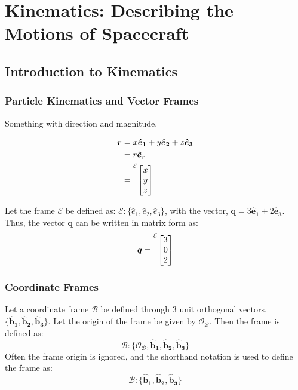 \section{Kinematics: Describing the Motions of Spacecraft}
\subsection{Introduction to Kinematics}

\subsubsection{Particle Kinematics and Vector Frames}
\label{sub_sec:Particle Kinematics and Vector Frames}
Something with direction and magnitude.

\[
	\begin{aligned}
		\bm{r} & = x \bm{{\hat{e}_{1}}} + y \bm{{\hat{e}_{2}}} + z \bm{{\hat{e}_{3}}} \\
		       & = r \bm{{\hat{e}_{r}}}                                               \\
		       & = \prescript{\mathcal{E}}{}{
			\begin{bmatrix}
				x \\
				y \\
				z
			\end{bmatrix}
		}                                                                             \\
	\end{aligned}
\]

\begin{example}
	Let the frame \(\mathcal{E} \) be defined as: \(\mathcal{E} \colon \{ \hat{e} _1, \hat{e} _2, \hat{e} _3\} \), with the vector, \(\bm{q}  = 3 \bm{{\hat{e}_{1}}} + 2\bm{{\hat{e}_{3}}} \).\\
	Thus, the vector \(\bm{q} \) can be written in matrix form as:
	\[
		\bm{q}  = \prescript{\mathcal{E}}{}{
			\begin{bmatrix}
				3 \\
				0 \\
				2
			\end{bmatrix}
		}
	\]
\end{example}
\subsubsection*{Coordinate Frames}
\label{subsub_sec:Coordinate Frames}
Let a coordinate frame \(\mathcal{B} \) be defined through 3 unit orthogonal vectors, \( \{ \bm{{\hat{b}_{1}}} , \bm{{\hat{b}_{2}}} , \bm{{\hat{b}_{3}}}  \} \). Let the origin of the frame be given by \( \mathcal{O} _\mathcal{B} \). Then the frame is defined as:
\[
	\mathcal{B} \colon \{ \mathcal{O} _\mathcal{B} , \bm{{\hat{b}_{1}}} , \bm{{\hat{b}_{2}}} , \bm{{\hat{b}_{3}}}  \}
\]
Often the frame origin is ignored, and the shorthand notation is used to define the frame as:
\[
	\mathcal{B} \colon \{ \bm{{\hat{b}_{1}}} , \bm{{\hat{b}_{2}}} , \bm{{\hat{b}_{3}}}  \}
\]

